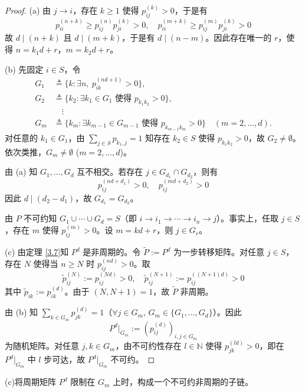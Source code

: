 \documentclass[lang=cn,10pt,thmcnt=section]{elegantbook}
\begin{document}
\begin{proof}
	(a) 由 $j \rightarrow i$，存在 $k \geq 1$ 使得 $p_{ij}^{(k)} > 0$，于是有
	\[
	p_{ii}^{(n+k)} \geq p_{ij}^{(n)} p_{ji}^{(k)} > 0, \quad p_{ii}^{(m+k)} \geq p_{ij}^{(m)} p_{ji}^{(k)} > 0
	\]
	故 $d\mid(n+k)$ 且 $d\mid(m+k)$，于是有 $d\mid(n-m)$。因此存在唯一的 $r$，使得 $n = k_1 d + r$，$m = k_2 d + r$。
	
	(b) 先固定 $i \in S$，令
	\begin{align*}
	G_1 &\triangleq \{k : \exists n,\ p_{ik}^{(nd+1)} > 0\}, \\
	G_2 &\triangleq \{k_2 : \exists k_1 \in G_1 \text{ 使得 } p_{k_1 k_2} > 0\}, \\
	&\quad \vdots \\
	G_m &\triangleq \{k_m : \exists k_{m-1} \in G_{m-1} \text{ 使得 } p_{k_{m-1} k_m} > 0\} \quad (m = 2, \ldots, d).
	\end{align*}
	对任意的 $k_1 \in G_1$，由 $\sum_{j \in S} p_{k_1,j} = 1$ 知存在 $k_2 \in S$ 使得 $p_{k_1 k_2} > 0$，故 $G_2 \neq \emptyset$。依次类推，$G_m \neq \emptyset$ ($m = 2, \ldots, d$)。
	
	由 (a) 知 $G_1, \ldots, G_d$ 互不相交。若存在 $j \in G_{d_1} \cap G_{d_2}$，则有
	\[
	p_{ij}^{(nd+d_1)} > 0, \quad p_{ij}^{(md+d_2)} > 0
	\]
	因此 $d\mid(d_2 - d_1)$，故 $G_{d_1} = G_{d_2}$。
	
	由 $P$ 不可约知 $G_1 \cup \cdots \cup G_d = S$（即 $i \rightarrow i_1 \rightarrow \cdots \rightarrow i_n \rightarrow j$）。事实上，任取 $j \in S$，存在 $m$ 使得 $p_{ij}^{(m)} > 0$。设 $m = kd + r$，则 $j \in G_r$。
	
	(c) 由定理 \ref{3.7}知 $P^d$ 是非周期的。令 $\widetilde{P} := P^d$ 为一步转移矩阵。对任意 $j \in S$，存在 $N$ 使得当 $n \geq N$ 时 $p_{ij}^{(nd)} > 0$。取
	\[
	\widetilde{p}_{ij}^{(N)} := p_{ij}^{(Nd)} > 0, \quad \widetilde{p}_{ij}^{(N+1)} := p_{ij}^{((N+1)d)} > 0
	\]
	其中 $\widetilde{p}_{ik} := p_{ik}^{(d)}$。由于 $(N, N+1) = 1$，故 $\widetilde{P}$ 非周期。
	
	由 (b) 知 $\sum_{k \in G_m} p_{jk}^{(d)} = 1$（$\forall j \in G_m$, $G_m \in \{G_1, \ldots, G_d\}$）。因此
	\[
	P^d|_{G_m} := \left(p_{ij}^{(d)}\right)_{i,j \in G_m}
	\]
	为随机矩阵。对任意 $j, k \in G_m$，由不可约性存在 $l \in \mathbb{N}$ 使得 $p_{jk}^{(l d)} > 0$，即在 $P^d|_{G_m}$ 中 $l$ 步可达，故 $P^d|_{G_m}$ 不可约。
	\end{proof}
	\begin{remark}
		(c)将周期矩阵 $P^d$ 限制在 $G_m$ 上时，构成一个不可约非周期的子链。
	\end{remark}
\end{document}
